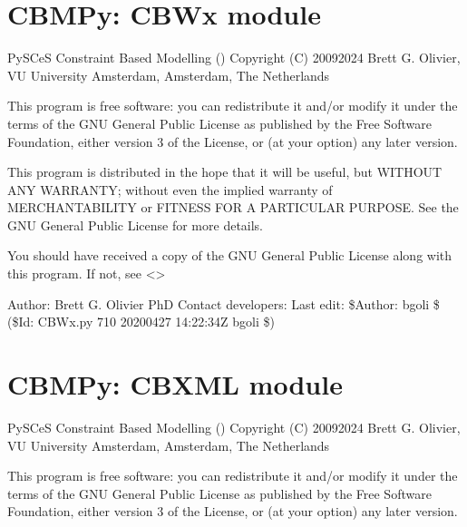 \documentclass[letterpaper,10pt,english]{sphinxmanual}
\begin{document}
\label{\detokenize{modules_doc:module-cbmpy.CBWx}}

\section{CBMPy: CBWx module}
\label{\detokenize{modules_doc:cbmpy-cbwx-module}}
\sphinxAtStartPar
PySCeS Constraint Based Modelling ()
Copyright (C) 2009\sphinxhyphen{}2024 Brett G. Olivier, VU University Amsterdam, Amsterdam, The Netherlands

\sphinxAtStartPar
This program is free software: you can redistribute it and/or modify
it under the terms of the GNU General Public License as published by
the Free Software Foundation, either version 3 of the License, or
(at your option) any later version.

\sphinxAtStartPar
This program is distributed in the hope that it will be useful,
but WITHOUT ANY WARRANTY; without even the implied warranty of
MERCHANTABILITY or FITNESS FOR A PARTICULAR PURPOSE.  See the
GNU General Public License for more details.

\sphinxAtStartPar
You should have received a copy of the GNU General Public License
along with this program.  If not, see \textless{}\textgreater{}

\sphinxAtStartPar
Author: Brett G. Olivier PhD
Contact developers: 
Last edit: \$Author: bgoli \$ (\$Id: CBWx.py 710 2020\sphinxhyphen{}04\sphinxhyphen{}27 14:22:34Z bgoli \$)
\label{\detokenize{modules_doc:module-cbmpy.CBXML}}

\section{CBMPy: CBXML module}
\label{\detokenize{modules_doc:cbmpy-cbxml-module}}
\sphinxAtStartPar
PySCeS Constraint Based Modelling ()
Copyright (C) 2009\sphinxhyphen{}2024 Brett G. Olivier, VU University Amsterdam, Amsterdam, The Netherlands

\sphinxAtStartPar
This program is free software: you can redistribute it and/or modify
it under the terms of the GNU General Public License as published by
the Free Software Foundation, either version 3 of the License, or
(at your option) any later version.
\end{document}
